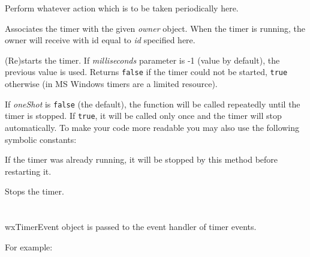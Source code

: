 Perform whatever action which is to be taken periodically here.

\label{wxtimersetowner}


Associates the timer with the given {\it owner}\/ object. When the timer is
running, the owner will receive  with
id equal to {\it id}\/ specified here.

\label{wxtimerstart}


(Re)starts the timer. If {\it milliseconds}\/ parameter is -1 (value by default),
the previous value is used. Returns {\tt false} if the timer could not be started,
{\tt true} otherwise (in MS Windows timers are a limited resource).

If {\it oneShot}\/ is {\tt false} (the default), the  
function will be called repeatedly until the timer is stopped. If {\tt true},
it will be called only once and the timer will stop automatically. To make your
code more readable you may also use the following symbolic constants:

\twocolwidtha{5cm}
\begin{twocollist}\itemsep=0pt
\end{twocollist}

If the timer was already running, it will be stopped by this method before
restarting it.

\label{wxtimerstop}


Stops the timer.







\section{}\label{wxtimerevent}

wxTimerEvent object is passed to the event handler of timer events.

For example:

